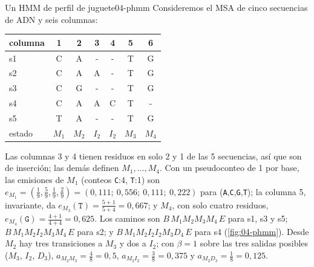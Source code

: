 \begin{ejemplo}{Un HMM de perfil de juguete}{04-phmm}
Consideremos el MSA de cinco secuencias de ADN y seis columnas:
\begin{center}
\ttfamily\small
\begin{tabular}{@{}l cccccc@{}}
\textrm{\sffamily\scriptsize columna} & 1 & 2 & 3 & 4 & 5 & 6\\
\midrule
s1 & C & A & - & - & T & G\\
s2 & C & A & A & - & T & G\\
s3 & C & G & - & - & T & G\\
s4 & C & A & A & C & T & -\\
s5 & T & A & - & - & T & G\\
\midrule
\textrm{\sffamily\scriptsize estado} & $M_1$ & $M_2$ & $I_2$ & $I_2$ & $M_3$ & $M_4$
\end{tabular}
\end{center}
Las columnas 3 y 4 tienen residuos en solo 2 y 1 de las 5 secuencias, así que son de inserción; las demás definen $M_1,\dots,M_4$. Con un pseudoconteo de 1 por base, las emisiones de $M_1$ (conteos \texttt{C}:4, \texttt{T}:1) son $e_{M_1}=(\tfrac19,\tfrac59,\tfrac19,\tfrac29)=(0{,}111;\ 0{,}556;\ 0{,}111;\ 0{,}222)$ para (\texttt{A},\texttt{C},\texttt{G},\texttt{T}); la columna 5, invariante, da $e_{M_3}(\texttt{T})=\tfrac{5+1}{5+4}=0{,}667$; y $M_4$, con solo cuatro residuos, $e_{M_4}(\texttt{G})=\tfrac{4+1}{4+4}=0{,}625$. Los caminos son \mbox{$B\,M_1M_2M_3M_4\,E$} para s1, s3 y s5; \mbox{$B\,M_1M_2I_2M_3M_4\,E$} para s2; y \mbox{$B\,M_1M_2I_2I_2M_3D_4\,E$} para s4 (\cref{fig:04-phmm}). Desde $M_2$ hay tres transiciones a $M_3$ y dos a $I_2$; con $\beta=1$ sobre las tres salidas posibles ($M_3$, $I_2$, $D_3$), $a_{M_2M_3}=\tfrac{4}{8}=0{,}5$, $a_{M_2I_2}=\tfrac38=0{,}375$ y $a_{M_2D_3}=\tfrac18=0{,}125$.
\end{ejemplo}

